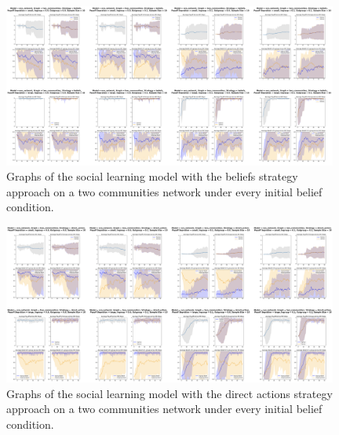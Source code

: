 \documentclass[]{llncs}
\begin{document}
\begin{figure}
\centering
\includegraphics[width=11cm]{images/social_twocommunities1}
\caption{\label{social_twocommunities1} Graphs of the social learning model with the beliefs strategy approach on a two communities network under every initial belief condition.}
\end{figure}
\begin{figure}
\centering
\includegraphics[width=11cm]{images/social_twocommunities2}
\caption{\label{social_twocommunities2} Graphs of the social learning model with the direct actions strategy approach on a two communities network under every initial belief condition.}
\end{figure}
\end{document}
